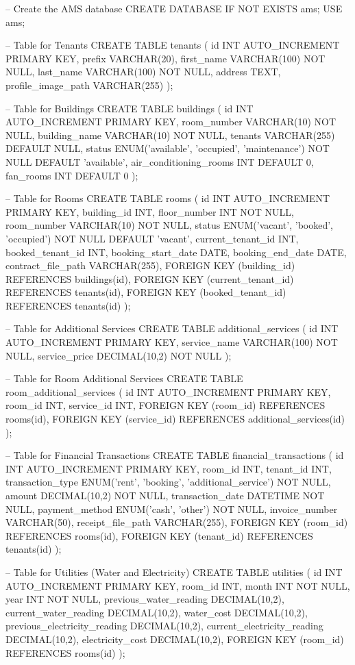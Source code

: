 -- Create the AMS database
CREATE DATABASE IF NOT EXISTS ams;
USE ams;

-- Table for Tenants
CREATE TABLE tenants (
    id INT AUTO_INCREMENT PRIMARY KEY,
    prefix VARCHAR(20),
    first_name VARCHAR(100) NOT NULL,
    last_name VARCHAR(100) NOT NULL,
    address TEXT,
    profile_image_path VARCHAR(255)
);

-- Table for Buildings
CREATE TABLE buildings (
    id INT AUTO_INCREMENT PRIMARY KEY,
    room_number VARCHAR(10) NOT NULL,
    building_name VARCHAR(10) NOT NULL,
    tenants VARCHAR(255) DEFAULT NULL,
    status ENUM('available', 'occupied', 'maintenance') NOT NULL DEFAULT 'available',
    air_conditioning_rooms INT DEFAULT 0,
    fan_rooms INT DEFAULT 0
);

-- Table for Rooms
CREATE TABLE rooms (
    id INT AUTO_INCREMENT PRIMARY KEY,
    building_id INT,
    floor_number INT NOT NULL,
    room_number VARCHAR(10) NOT NULL,
    status ENUM('vacant', 'booked', 'occupied') NOT NULL DEFAULT 'vacant',
    current_tenant_id INT,
    booked_tenant_id INT,
    booking_start_date DATE,
    booking_end_date DATE,
    contract_file_path VARCHAR(255),
    FOREIGN KEY (building_id) REFERENCES buildings(id),
    FOREIGN KEY (current_tenant_id) REFERENCES tenants(id),
    FOREIGN KEY (booked_tenant_id) REFERENCES tenants(id)
);

-- Table for Additional Services
CREATE TABLE additional_services (
    id INT AUTO_INCREMENT PRIMARY KEY,
    service_name VARCHAR(100) NOT NULL,
    service_price DECIMAL(10,2) NOT NULL
);

-- Table for Room Additional Services
CREATE TABLE room_additional_services (
    id INT AUTO_INCREMENT PRIMARY KEY,
    room_id INT,
    service_id INT,
    FOREIGN KEY (room_id) REFERENCES rooms(id),
    FOREIGN KEY (service_id) REFERENCES additional_services(id)
);

-- Table for Financial Transactions
CREATE TABLE financial_transactions (
    id INT AUTO_INCREMENT PRIMARY KEY,
    room_id INT,
    tenant_id INT,
    transaction_type ENUM('rent', 'booking', 'additional_service') NOT NULL,
    amount DECIMAL(10,2) NOT NULL,
    transaction_date DATETIME NOT NULL,
    payment_method ENUM('cash', 'other') NOT NULL,
    invoice_number VARCHAR(50),
    receipt_file_path VARCHAR(255),
    FOREIGN KEY (room_id) REFERENCES rooms(id),
    FOREIGN KEY (tenant_id) REFERENCES tenants(id)
);

-- Table for Utilities (Water and Electricity)
CREATE TABLE utilities (
    id INT AUTO_INCREMENT PRIMARY KEY,
    room_id INT,
    month INT NOT NULL,
    year INT NOT NULL,
    previous_water_reading DECIMAL(10,2),
    current_water_reading DECIMAL(10,2),
    water_cost DECIMAL(10,2),
    previous_electricity_reading DECIMAL(10,2),
    current_electricity_reading DECIMAL(10,2),
    electricity_cost DECIMAL(10,2),
    FOREIGN KEY (room_id) REFERENCES rooms(id)
);

